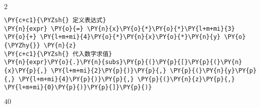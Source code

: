     $\displaystyle 2$

    

    \begin{tcolorbox}[breakable, size=fbox, boxrule=1pt, pad at break*=1mm,colback=cellbackground, colframe=cellborder]
\begin{Verbatim}[commandchars=\\\{\}]
\PY{c+c1}{\PYZsh{} 定义表达式}
\PY{n}{expr} \PY{o}{=} \PY{n}{x}\PY{o}{*}\PY{o}{*}\PY{l+m+mi}{3} \PY{o}{+} \PY{l+m+mi}{4}\PY{o}{*}\PY{n}{x}\PY{o}{*}\PY{n}{y} \PY{o}{\PYZhy{}} \PY{n}{z}
\PY{c+c1}{\PYZsh{} 代入数字求值}
\PY{n}{expr}\PY{o}{.}\PY{n}{subs}\PY{p}{(}\PY{p}{[}\PY{p}{(}\PY{n}{x}\PY{p}{,} \PY{l+m+mi}{2}\PY{p}{)}\PY{p}{,} \PY{p}{(}\PY{n}{y}\PY{p}{,} \PY{l+m+mi}{4}\PY{p}{)}\PY{p}{,} \PY{p}{(}\PY{n}{z}\PY{p}{,} \PY{l+m+mi}{0}\PY{p}{)}\PY{p}{]}\PY{p}{)}
\end{Verbatim}
\end{tcolorbox}
 
            
    
    $\displaystyle 40$
